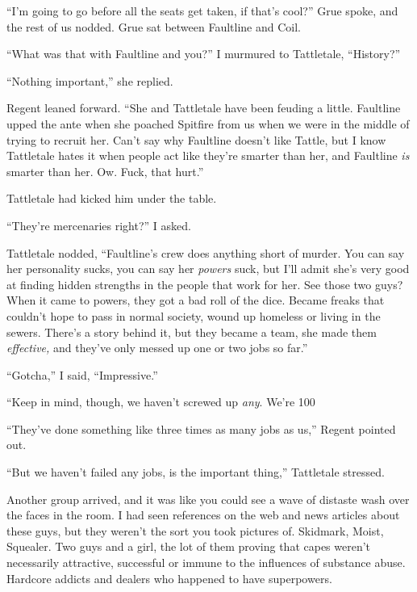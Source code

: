 ``I'm going to go before all the seats get taken, if that's cool?'' Grue spoke, and the rest of us nodded.  Grue sat between Faultline and Coil.



``What was that with Faultline and you?'' I murmured to Tattletale, ``History?''



``Nothing important,'' she replied.



Regent leaned forward.  ``She and Tattletale have been feuding a little.  Faultline upped the ante when she poached Spitfire from us when we were in the middle of trying to recruit her.  Can't say why Faultline doesn't like Tattle, but I know Tattletale hates it when people act like they're smarter than her, and Faultline \emph{is }smarter than her.  Ow.  Fuck, that hurt.''



Tattletale had kicked him under the table.



``They're mercenaries right?'' I asked.



Tattletale nodded, ``Faultline's crew does anything short of murder.  You can say her personality sucks, you can say her \emph{powers} suck, but I'll admit she's very good at finding hidden strengths in the people that work for her.  See those two guys?  When it came to powers, they got a bad roll of the dice.  Became freaks that couldn't hope to pass in normal society, wound up homeless or living in the sewers.  There's a story behind it, but they became a team, she made them \emph{effective, }and they've only messed up one or two jobs so far.''



``Gotcha,'' I said, ``Impressive.''



``Keep in mind, though, we haven't screwed up \emph{any}.  We're 100%



``They've done something like three times as many jobs as us,'' Regent pointed out.



``But we haven't failed any jobs, is the important thing,'' Tattletale stressed.



Another group arrived, and it was like you could see a wave of distaste wash over the faces in the room.  I had seen references on the web and news articles about these guys, but they weren't the sort you took pictures of.  Skidmark, Moist, Squealer.  Two guys and a girl, the lot of them proving that capes weren't necessarily attractive, successful or immune to the influences of substance abuse.  Hardcore addicts and dealers who happened to have superpowers.



